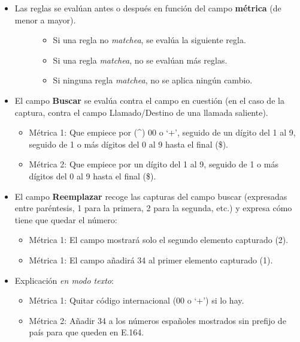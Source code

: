 \documentclass[letterpaper,10pt,spanish]{sphinxmanual}
\begin{document}
\noindent{}
\begin{itemize}
\item {} \begin{description}
\item[{Las reglas se evalúan antes o después en función del campo \textbf{métrica} (de menor a mayor).}] \leavevmode\begin{itemize}
\item {} 
Si una regla no \emph{matchea}, se evalúa la siguiente regla.

\item {} 
Si una regla \emph{matchea}, no se evalúan más reglas.

\item {} 
Si ninguna regla \emph{matchea}, no se aplica ningún cambio.

\end{itemize}

\end{description}

\item {} 
El campo \textbf{Buscar} se evalúa contra el campo en cuestión (en el caso de la captura, contra el campo Llamado/Destino de una llamada saliente).
\begin{itemize}
\item {} 
Métrica 1: Que empiece por (\textasciicircum{}) 00 o `+', seguido de un dígito del 1 al 9, seguido de 1 o más dígitos del 0 al 9 hasta el final (\$).

\item {} 
Métrica 2: Que empiece por un dígito del 1 al 9, seguido de 1 o más dígitos del 0 al 9 hasta el final (\$).

\end{itemize}

\item {} 
El campo \textbf{Reemplazar} recoge las capturas del campo buscar (expresadas entre paréntesis, 1 para la primera, 2 para la segunda, etc.) y expresa cómo tiene que quedar el número:
\begin{itemize}
\item {} 
Métrica 1: El campo mostrará solo el segundo elemento capturado (2).

\item {} 
Métrica 1: El campo añadirá 34 al primer elemento capturado (1).

\end{itemize}

\item {} 
Explicación \emph{en modo texto}:
\begin{itemize}
\item {} 
Métrica 1: Quitar código internacional (00 o `+') si lo hay.

\item {} 
Métrica 2: Añadir 34 a los números españoles mostrados sin prefijo de país para que queden en E.164.

\end{itemize}

\end{itemize}
\end{document}
